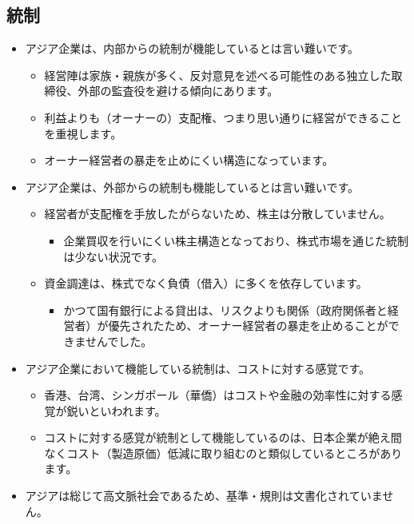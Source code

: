 \documentclass[
]{book}
\providecommand{\tightlist}{%
  \setlength{\itemsep}{0pt}\setlength{\parskip}{0pt}}
\begin{document}
\hypertarget{asia-control}{%
\subsection{統制}\label{asia-control}}

\begin{itemize}
\item
  アジア企業は、内部からの統制が機能しているとは言い難いです。

  \begin{itemize}
  \item
    経営陣は家族・親族が多く、反対意見を述べる可能性のある独立した取締役、外部の監査役を避ける傾向にあります。
  \item
    利益よりも（オーナーの）支配権、つまり思い通りに経営ができることを重視します。
  \item
    オーナー経営者の暴走を止めにくい構造になっています。
  \end{itemize}
\item
  アジア企業は、外部からの統制も機能しているとは言い難いです。

  \begin{itemize}
  \item
    経営者が支配権を手放したがらないため、株主は分散していません。

    \begin{itemize}
    \tightlist
    \item
      企業買収を行いにくい株主構造となっており、株式市場を通じた統制は少ない状況です。
    \end{itemize}
  \item
    資金調達は、株式でなく負債（借入）に多くを依存しています。

    \begin{itemize}
    \tightlist
    \item
      かつて国有銀行による貸出は、リスクよりも関係（政府関係者と経営者）が優先されたため、オーナー経営者の暴走を止めることができませんでした。
    \end{itemize}
  \end{itemize}
\item
  アジア企業において機能している統制は、コストに対する感覚です。

  \begin{itemize}
  \item
    香港、台湾、シンガポール（華僑）はコストや金融の効率性に対する感覚が鋭いといわれます。
  \item
    コストに対する感覚が統制として機能しているのは、日本企業が絶え間なくコスト（製造原価）低減に取り組むのと類似しているところがあります。
  \end{itemize}
\item
  アジアは総じて高文脈社会であるため、基準・規則は文書化されていません。


\end{itemize}
\end{document}
